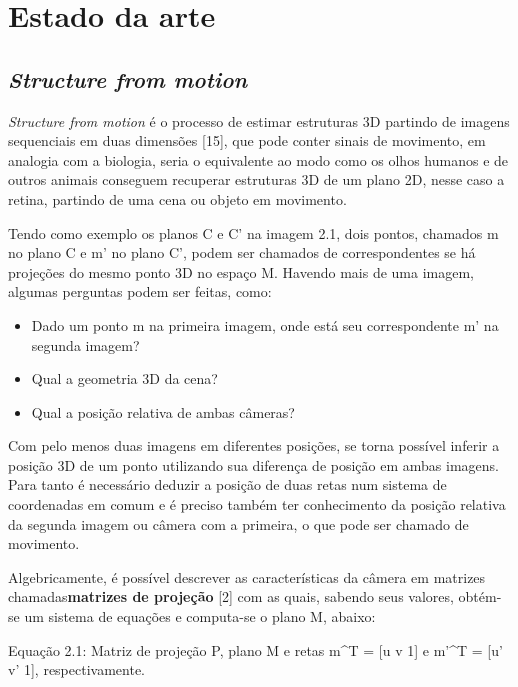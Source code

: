\chapter{Estado da arte}

\section{\textit{Structure from motion}}

\textit{Structure from motion} é o processo de estimar estruturas 3D partindo de imagens sequenciais em duas dimensões [15], que pode conter sinais de movimento, em analogia com a biologia, seria o equivalente ao modo  como os olhos humanos e de outros animais conseguem recuperar estruturas 3D de um plano 2D, nesse caso a retina, partindo de uma cena ou objeto em movimento.

Tendo como exemplo os planos C e C’ na imagem 2.1, dois pontos, chamados m no plano C e m’ no plano C', podem ser chamados de correspondentes se há projeções do mesmo ponto 3D no espaço M. Havendo mais de uma imagem, algumas perguntas podem ser feitas, como:

\begin{itemize}
	\item{Dado um ponto m na primeira imagem, onde está seu correspondente m’ na segunda imagem?}
	\item{Qual a geometria 3D da cena?}
	\item{Qual a posição relativa de ambas câmeras?}
\end{itemize}
	
Com pelo menos duas imagens em diferentes posições, se torna possível inferir a posição 3D de um ponto utilizando sua diferença de posição em ambas imagens. Para tanto é necessário deduzir a posição de duas retas num sistema de coordenadas em comum e é preciso também ter conhecimento da posição relativa da segunda imagem ou câmera com a primeira, o que pode ser chamado de movimento.

Algebricamente, é possível descrever as características da câmera em matrizes chamadas\textbf{matrizes de projeção} [2] com as quais, sabendo seus valores, obtém-se um sistema de equações e computa-se o plano M, abaixo:


Equação 2.1: Matriz de projeção P, plano M e retas m\textasciicircum T = [u v 1] e m’\textasciicircum T = [u’ v’ 1], respectivamente.


